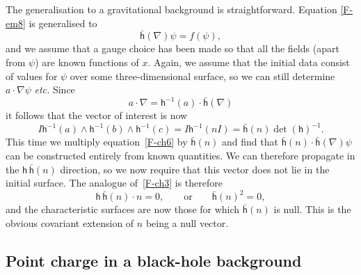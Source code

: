 \documentclass[a4paper]{article}
\numberwithin{equation}{section}
\newcommand{\dt}{\! \cdot \!}
\newcommand{\wdg}{\! \wedge \!}
\newcommand{\lih}{\mathsf{h}}
\newcommand{\lbh}{\bar{\mathsf{h}}}
\newcommand{\ho}{\lbh}
\newcommand{\hu}{\lih}
\newcommand{\grad}{\nabla}
\newcommand{\dhi}{\det(\hu)^{-1}}
\begin{document}
The generalisation to a gravitational background is straightforward.
Equation \eqref{F-em8} is generalised to
%
\begin{equation} 
\ho(\grad) \psi = f(\psi),
\label{F-ch6}
\end{equation}
%
and we assume that a gauge choice has been made so that all the fields
(apart from $\psi$) are known functions of $x$.  Again, we assume that
the initial data consist of values for $\psi$ over some
three-dimensional surface, so we can still determine $a\dt\grad\psi$
{\em etc.}  Since
%
\begin{equation}
a\dt\grad = \hu^{-1}(a)\dt\ho(\grad)
\end{equation}
%
it follows that the vector of interest is now
%
\begin{equation}
I \hu^{-1}(a) \wdg \hu^{-1}(b) \wdg \hu^{-1}(c) = I \hu^{-1} (n I)
= \ho(n) \dhi. 
\end{equation}
%
This time we multiply equation~\eqref{F-ch6} by $\ho(n)$ and find that
$\ho(n)\dt\ho(\grad)\psi$ can be constructed entirely from known
quantities.  We can therefore propagate in the $\hu\,\ho(n)$
direction, so we now require that this vector does not lie in the
initial surface.  The analogue of~\eqref{F-ch3} is therefore
%
\begin{equation}
\hu\,\ho(n) \dt n = 0, \qquad \mbox{or} \qquad \ho(n)^2=0,
\end{equation}
%
and the characteristic surfaces are now those for which $\ho(n)$ is
null.  This is the obvious covariant extension of $n$ being a null
vector.



\subsection{Point charge in a black-hole background}
\end{document}
